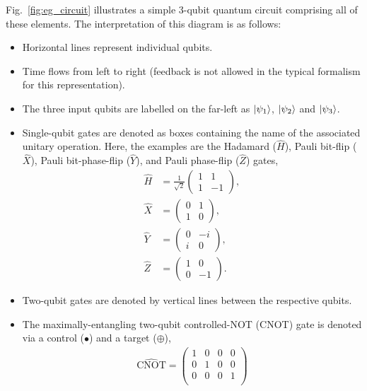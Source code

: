 Fig.~\ref{fig:eg_circuit} illustrates a simple 3-qubit quantum circuit comprising all of these elements. The interpretation of this diagram is as follows:
\begin{itemize}
	\item Horizontal lines represent individual qubits.
	\item Time flows from left to right (feedback is not allowed in the typical formalism for this representation).
	\item The three input qubits are labelled on the far-left as $|\psi_1\rangle$, $|\psi_2\rangle$ and $|\psi_3\rangle$.
	\item Single-qubit gates are denoted as boxes containing the name of the associated unitary operation. Here, the examples are the Hadamard ($\hat{H}$), Pauli bit-flip ($\hat{X}$), Pauli bit-phase-flip ($\hat{Y}$), and Pauli phase-flip ($\hat{Z}$) gates,
	\begin{align}
		\hat{H} &= \frac{1}{\sqrt{2}}\begin{pmatrix}
		1 & 1 \\
		1 & -1
		\end{pmatrix},\nonumber \\
		\hat{X} &= \begin{pmatrix}
		0 & 1 \\
		1 & 0
		\end{pmatrix},\nonumber \\
		\hat{Y} &= \begin{pmatrix}
		0 & -i \\
		i & 0
		\end{pmatrix},\nonumber \\
		\hat{Z} &= \begin{pmatrix}
		1 & 0 \\
		0 & -1
		\end{pmatrix}.
	\end{align}
	\item Two-qubit gates are denoted by vertical lines between the respective qubits.
	\item The maximally-entangling two-qubit controlled-NOT (CNOT) gate is denoted via a control ($\bullet$) and a target ($\oplus$),
	\begin{align}
		\hat{\text{CNOT}}=\begin{pmatrix}
		1 & 0 & 0 & 0 \\
		0 & 1 & 0 & 0 \\
		0 & 0 & 0 & 1 \\

\end{pmatrix}
\end{align}
\end{itemize}
